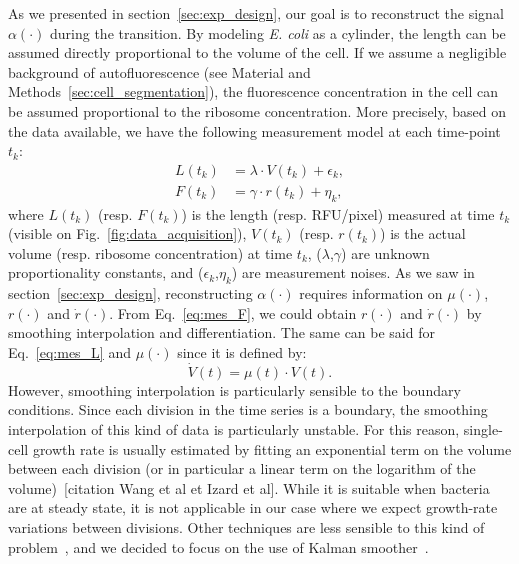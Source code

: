 As we presented in section~\ref{sec:exp_design}, our goal is to reconstruct the signal $\alpha (\cdot)$ during the transition.
By modeling \textit{E. coli} as a cylinder, the length can be assumed directly proportional to the volume of the cell.
If we assume a negligible background of autofluorescence (see Material and Methods~\ref{sec:cell_segmentation}), the fluorescence concentration in the cell can be assumed proportional to the ribosome concentration.
More precisely, based on the data available, we have the following measurement model at each time-point $t_k$:
\begin{eqnarray}
L(t_k) &= \lambda \cdot V(t_k) + \epsilon_k, \label{eq:mes_L}\\
F(t_k) &= \gamma \cdot r(t_k) + \eta_k, \label{eq:mes_F}
\end{eqnarray}
where $L(t_k)$ (resp. $F(t_k)$) is the length (resp. RFU/pixel) measured at time $t_k$ (visible on Fig.~\ref{fig:data_acquisition}), $V(t_k)$ (resp. $r(t_k)$) is the actual volume (resp. ribosome concentration) at time $t_k$, ($\lambda$,$\gamma$) are unknown proportionality constants, and ($\epsilon_k$,$\eta_k$) are measurement noises.
As we saw in section~\ref{sec:exp_design}, reconstructing $\alpha (\cdot)$ requires information on $\mu (\cdot)$, $r(\cdot)$ and $\dot{r}(\cdot)$.
From Eq.~\ref{eq:mes_F}, we could obtain $r(\cdot)$ and $\dot{r}(\cdot)$ by smoothing interpolation and differentiation.
The same can be said for Eq.~\ref{eq:mes_L} and $\mu (\cdot)$ since it is defined by:
\[
\dot{V}(t) = \mu (t) \cdot V(t).
\]
However, smoothing interpolation is particularly sensible to the boundary conditions.
Since each division in the time series is a boundary, the smoothing interpolation of this kind of data is particularly unstable.
For this reason, single-cell growth rate is usually estimated by fitting an exponential term on the volume between each division (or in particular a linear term on the logarithm of the volume)~[citation Wang et al et Izard et al].
While it is suitable when bacteria are at steady state, it is not applicable in our case where we expect growth-rate variations between divisions.
Other techniques are less sensible to this kind of problem~\cite{zulkower_robust_2015}, and we decided to focus on the use of Kalman smoother~\cite{kailath_linear_2000,jazwinski_stochastic_2007}.

